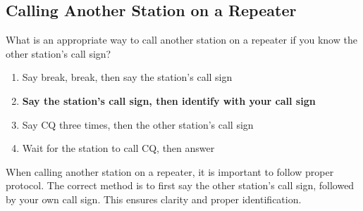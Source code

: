 \subsection{Calling Another Station on a Repeater}
\label{T2A04}

\begin{tcolorbox}[colback=gray!10!white,colframe=black!75!black,title=T2A04]
What is an appropriate way to call another station on a repeater if you know the other station's call sign?
\begin{enumerate}[noitemsep]
    \item Say break, break, then say the station's call sign
    \item \textbf{Say the station's call sign, then identify with your call sign}
    \item Say CQ three times, then the other station's call sign
    \item Wait for the station to call CQ, then answer
\end{enumerate}
\end{tcolorbox}

When calling another station on a repeater, it is important to follow proper protocol. The correct method is to first say the other station's call sign, followed by your own call sign. This ensures clarity and proper identification.